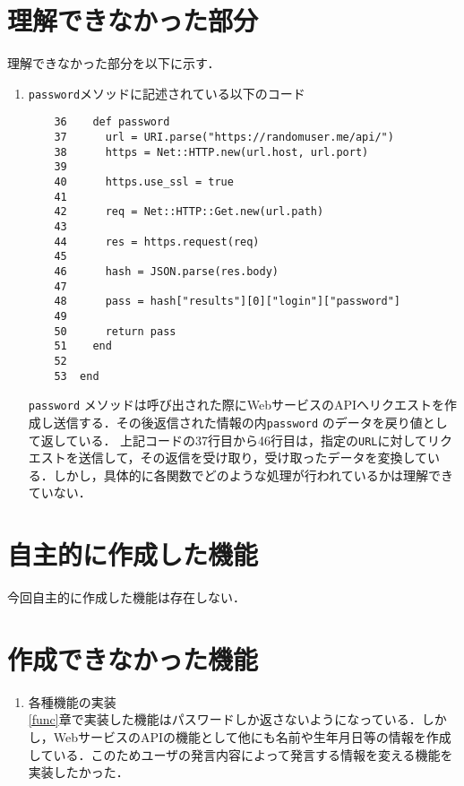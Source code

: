 \documentclass[12pt]{jsarticle}
\begin{document}
\section{理解できなかった部分}\label{sec3}
理解できなかった部分を以下に示す．
\begin{enumerate}
\item \verb|password|メソッドに記述されている以下のコード  
\begin{verbatim}
    36	  def password
    37	    url = URI.parse("https://randomuser.me/api/")
    38	    https = Net::HTTP.new(url.host, url.port)
    39	
    40	    https.use_ssl = true
    41	
    42	    req = Net::HTTP::Get.new(url.path)
    43	
    44	    res = https.request(req)
    45	
    46	    hash = JSON.parse(res.body)
    47	
    48	    pass = hash["results"][0]["login"]["password"] 
    49	
    50	    return pass
    51	  end
    52	  
    53	end
\end{verbatim}
\verb|password| メソッドは呼び出された際にWebサービスのAPIへリクエストを作成し送信する．その後返信された情報の内\verb|password| のデータを戻り値として返している．
上記コードの37行目から46行目は，指定の\verb|URL|に対してリクエストを送信して，その返信を受け取り，受け取ったデータを変換している．しかし，具体的に各関数でどのような処理が行われているかは理解できていない．
\end{enumerate}
   
\section{自主的に作成した機能}\label{sec4}
今回自主的に作成した機能は存在しない．

\section{作成できなかった機能}\label{sec5}
\begin{enumerate}
\item 各種機能の実装\\
  \ref{func}章で実装した機能はパスワードしか返さないようになっている．しかし，WebサービスのAPIの機能として他にも名前や生年月日等の情報を作成している．このためユーザの発言内容によって発言する情報を変える機能を実装したかった．
\end{enumerate}


\end{document}
